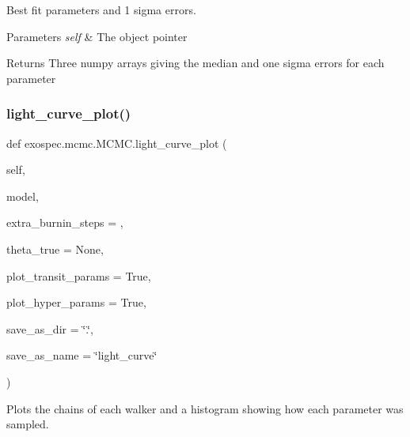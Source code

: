 Best fit parameters and 1 sigma errors. 


\begin{DoxyParams}{Parameters}
{\em self} & The object pointer \\
\hline
\end{DoxyParams}
\begin{DoxyReturn}{Returns}
Three numpy arrays giving the median and one sigma errors for each parameter 
\end{DoxyReturn}
\mbox{\label{classexospec_1_1mcmc_1_1_m_c_m_c_ab2c5cc870e2b384534404f3bc667e039}} 
\subsubsection{\texorpdfstring{light\+\_\+curve\+\_\+plot()}{light\_curve\_plot()}}
{\footnotesize\ttfamily def exospec.\+mcmc.\+M\+C\+M\+C.\+light\+\_\+curve\+\_\+plot (\begin{DoxyParamCaption}\item[{}]{self,  }\item[{}]{model,  }\item[{}]{extra\+\_\+burnin\+\_\+steps = {},  }\item[{}]{theta\+\_\+true = {\ttfamily None},  }\item[{}]{plot\+\_\+transit\+\_\+params = {\ttfamily True},  }\item[{}]{plot\+\_\+hyper\+\_\+params = {\ttfamily True},  }\item[{}]{save\+\_\+as\+\_\+dir = {\ttfamily \char`\"{}.\char`\"{}},  }\item[{}]{save\+\_\+as\+\_\+name = {\ttfamily \char`\"{}light\+\_\+curve\char`\"{}} }\end{DoxyParamCaption})}



Plots the chains of each walker and a histogram showing how each parameter was sampled. 


